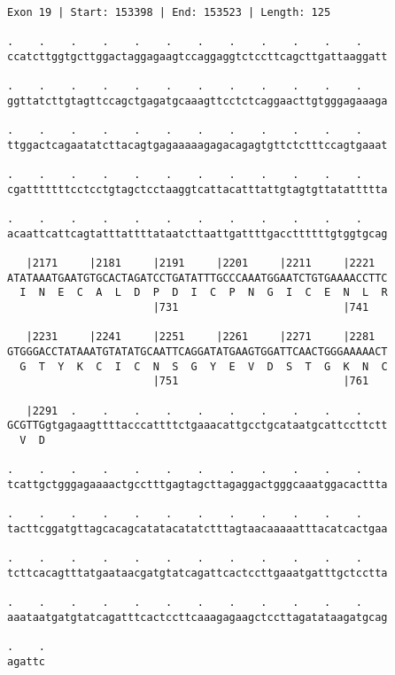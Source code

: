 \documentclass{article}
\begin{document}
\begin{Verbatim}[fontfamily=courier]
Exon 19 | Start: 153398 | End: 153523 | Length: 125

.    .    .    .    .    .    .    .    .    .    .    .    
ccatcttggtgcttggactaggagaagtccaggaggtctccttcagcttgattaaggatt

.    .    .    .    .    .    .    .    .    .    .    .    
ggttatcttgtagttccagctgagatgcaaagttcctctcaggaacttgtgggagaaaga

.    .    .    .    .    .    .    .    .    .    .    .    
ttggactcagaatatcttacagtgagaaaaagagacagagtgttctctttccagtgaaat

.    .    .    .    .    .    .    .    .    .    .    .    
cgatttttttcctcctgtagctcctaaggtcattacatttattgtagtgttatattttta

.    .    .    .    .    .    .    .    .    .    .    .    
acaattcattcagtatttattttataatcttaattgattttgaccttttttgtggtgcag

   |2171     |2181     |2191     |2201     |2211     |2221  
ATATAAATGAATGTGCACTAGATCCTGATATTTGCCCAAATGGAATCTGTGAAAACCTTC
  I  N  E  C  A  L  D  P  D  I  C  P  N  G  I  C  E  N  L  R
                       |731                          |741   

   |2231     |2241     |2251     |2261     |2271     |2281  
GTGGGACCTATAAATGTATATGCAATTCAGGATATGAAGTGGATTCAACTGGGAAAAACT
  G  T  Y  K  C  I  C  N  S  G  Y  E  V  D  S  T  G  K  N  C
                       |751                          |761   

   |2291  .    .    .    .    .    .    .    .    .    .    
GCGTTGgtgagaagttttacccattttctgaaacattgcctgcataatgcattccttctt
  V  D                                                      

.    .    .    .    .    .    .    .    .    .    .    .    
tcattgctgggagaaaactgcctttgagtagcttagaggactgggcaaatggacacttta

.    .    .    .    .    .    .    .    .    .    .    .    
tacttcggatgttagcacagcatatacatatctttagtaacaaaaatttacatcactgaa

.    .    .    .    .    .    .    .    .    .    .    .    
tcttcacagtttatgaataacgatgtatcagattcactccttgaaatgatttgctcctta

.    .    .    .    .    .    .    .    .    .    .    .    
aaataatgatgtatcagatttcactccttcaaagagaagctccttagatataagatgcag

.    .
agattc
\end{Verbatim}
\newpage
\end{document}
